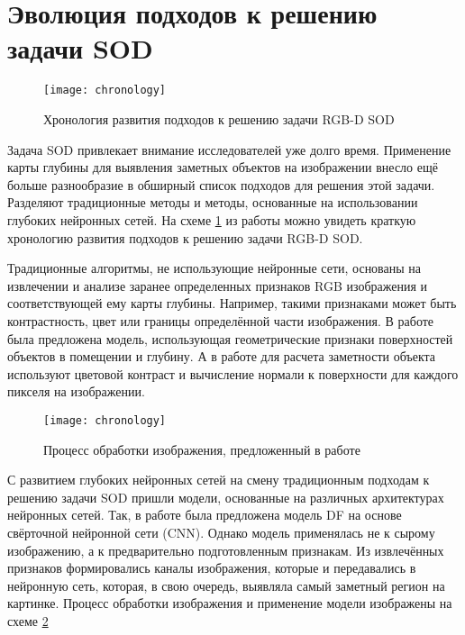 \section{Эволюция подходов к решению задачи SOD}

\begin{figure}
    \centering
    \texttt{[image: chronology]}
    \caption{Хронология развития подходов к решению задачи RGB-D SOD}
    \label{fig:chronology}
\end{figure}

Задача SOD привлекает внимание исследователей уже долго время. Применение карты глубины для выявления заметных объектов на изображении 
внесло ещё больше разнообразие в обширный список подходов для решения этой задачи. Разделяют традиционные методы и методы, основанные 
на использовании глубоких нейронных сетей. На схеме \ref{fig:chronology} из работы \cite{Survey} можно увидеть краткую хронологию развития
подходов к решению задачи RGB-D SOD.


Традиционные алгоритмы, не использующие нейронные сети, основаны на извлечении и анализе заранее определенных признаков RGB изображения и соответствующей ему карты глубины.
Например, такими признаками может быть контрастность, цвет или границы определённой части изображения. 
В работе \cite{Depth-really-Matters} была предложена модель, использующая геометрические признаки поверхностей объектов в помещении и глубину. 
А в работе \cite{Depth-View-of-Saliency} для расчета заметности объекта используют цветовой контраст и вычисление нормали к поверхности\cite{Surface-Normal} для каждого пикселя на изображении.

\begin{figure}
    \centering
    \texttt{[image: chronology]}
    \caption{Процесс обработки изображения, предложенный в работе \cite{RGBD-SOD-Deep-Fusion}}
    \label{fig:pipeline}
\end{figure}

С развитием глубоких нейронных сетей на смену традиционным подходам к решению задачи SOD пришли модели, основанные на различных архитектурах нейронных сетей.
Так, в работе \cite{RGBD-SOD-Deep-Fusion} была предложена модель DF на основе свёрточной нейронной сети (CNN). Однако модель применялась не к сырому изображению, 
а к предварительно подготовленным признакам. Из извлечённых признаков формировались каналы изображения, которые и передавались в нейронную сеть, которая, в свою очередь,
выявляла самый заметный регион на картинке. Процесс обработки изображения и применение модели изображены на схеме \ref{fig:pipeline}


